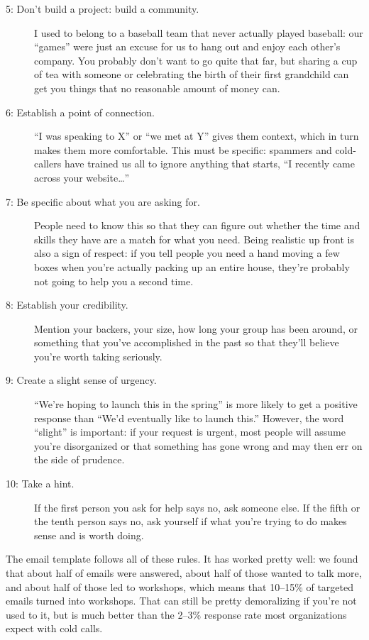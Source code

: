 \begin{description}
  \item[5: Don't build a project: build a community.]
    I used to belong to a baseball team that never actually played baseball:
    our ``games'' were just an excuse for us to hang out and enjoy each other's company.
    You probably don't want to go quite that far,
    but sharing a cup of tea with someone or celebrating the birth of their first grandchild
    can get you things that no reasonable amount of money can.

  \item[6: Establish a point of connection.]
    ``I was speaking to X'' or ``we met at Y'' gives them context,
    which in turn makes them more comfortable.
    This must be specific:
    spammers and cold-callers have trained us all to ignore anything that starts,
    ``I recently came across your website{\ldots}''

  \item[7: Be specific about what you are asking for.]
    People need to know this
    so that they can figure out whether the time and skills they have
    are a match for what you need.
    Being realistic up front is also a sign of respect:
    if you tell people you need a hand moving a few boxes
    when you're actually packing up an entire house,
    they're probably not going to help you a second time.

  \item[8: Establish your credibility.]
    Mention your backers,
    your size,
    how long your group has been around, or something that you've accomplished in the past
    so that they'll believe you're worth taking seriously.

\item[9: Create a slight sense of urgency.]
  ``We're hoping to launch this in the spring'' is more likely to get a positive response
  than ``We'd eventually like to launch this.''
  However, the word ``slight'' is important:
  if your request is urgent,
  most people will assume you're disorganized or that something has gone wrong
  and may then err on the side of prudence.

\item[10: Take a hint.]
  If the first person you ask for help says no,
  ask someone else.
  If the fifth or the tenth person says no,
  ask yourself if what you're trying to do makes sense and is worth doing.

\end{description}

The email template follows all of these rules.
It has worked pretty well:
we found that about half of emails were answered,
about half of those wanted to talk more,
and about half of those led to workshops,
which means that 10--15\% of targeted emails turned into workshops.
That can still be pretty demoralizing if you're not used to it,
but is much better than the 2--3\% response rate most organizations expect with cold calls.

